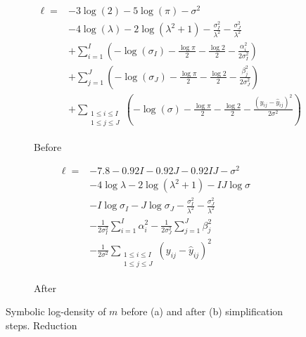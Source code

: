 \documentclass[anonymous=false, %
               format=acmsmall, %
               review=true, %
               screen=true, %
               nonacm=true]{acmart}
\begin{document}
\begin{figure}[t!]
    \centering
    
    \begin{subfigure}[t]{0.4\textwidth}
        \[
    \begin{aligned}
        \ell = 
           &- 3 \log{\left(2 \right)} 
            - 5 \log{\left(\pi \right)} 
            - σ^{2} 
        \\ &- 4 \log{\left(λ \right)} 
            - 2 \log{\left(λ^{2} + 1 \right)} 
            - \frac{σ_I^{2}}{λ^{2}} 
            - \frac{σ_J^{2}}{λ^{2}}
        \\ &+ \sum_{i=1}^{I} \left(- \log{\left(σ_I \right)} - \frac{\log{\pi }}{2} - \frac{\log{2 }}{2}     - \frac{{α}_{i}^{2}}{2 σ_I^{2}}\right) 
        \\ &+ \sum_{j=1}^{J} \left(- \log{\left(σ_J \right)} - \frac{\log{\pi }}{2} - \frac{\log{2 }}{2}     - \frac{{β}_{j}^{2}}{2 σ_J^{2}}\right) 
        \\ &+ \sum_{\substack{1 \leq i \leq I \\ 1 \leq j \leq J}} \left(- \log{\left(σ \right)} - \frac    {\log{\pi }}{2} - \frac{\log{2 }}{2} - \frac{\left({y}_{ij} - {\hat{y}}_{ij}\right)^{2}}{2 σ^{2}    }\right) 
    \end{aligned}
    \]
    \caption{Before}
    \end{subfigure}
    \hfill
    \begin{subfigure}[t]{0.4\textwidth}
        \[
    \begin{aligned}
    \ell =
    &- 7.8 - 0.92 I - 0.92 J - 0.92 I J - σ^{2} 
    \\ &- 4 \log{λ } - 2 \log{\left(λ^{2} + 1 \right)} 
        - I J \log{σ } 
    \\ &- I \log{σ_I } - J \log{σ_J } - \frac{σ_I^{2}}{λ^{2}}  - \frac{σ_J^{2}}{λ^{2}}
    \\ &- \frac{1}{2 σ_I^{2}} \sum_{i=1}^{I} {α}_{i}^{2}
        - \frac{1}{2 σ_J^{2}} \sum_{j=1}^{J} {β}_{j}^{2}
    \\ &- \frac{1}{2 σ^{2}} \sum_{\substack{1 \leq i \leq I\\1 \leq j \leq J}} \left({y}_{ij} - {\hat{y}}_{ij}\right)^{2}
    \end{aligned}
\]
    \captionsetup{skip=27pt}
    \caption{After}
    \end{subfigure}
    \caption{Symbolic log-density of $m$ before (a) and after (b) simplification steps. Reduction }
    \label{}
\end{figure}
\end{document}
